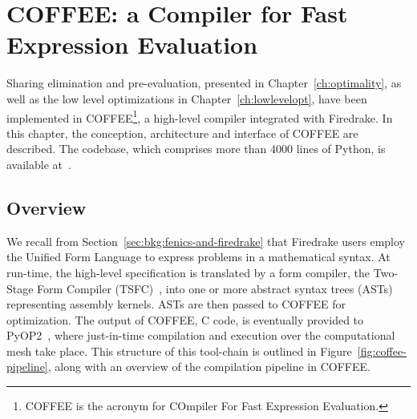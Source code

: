\chapter{COFFEE: a Compiler for Fast Expression Evaluation}
\label{ch:coffee}

Sharing elimination and pre-evaluation, presented in Chapter~\ref{ch:optimality}, as well as the low level optimizations in Chapter~\ref{ch:lowlevelopt}, have been implemented in COFFEE\footnote{COFFEE is the acronym for COmpiler For Fast Expression Evaluation.}, a high-level compiler integrated with Firedrake. In this chapter, the conception, architecture and interface of COFFEE are described. The codebase, which comprises more than 4000 lines of Python, is available at~\citep{coffee-code}.


\section{Overview}

We recall from Section~\ref{sec:bkg:fenics-and-firedrake} that Firedrake users employ the Unified Form Language to express problems in a mathematical syntax. At run-time, the high-level specification is translated by a form compiler, the Two-Stage Form Compiler (TSFC)~\citep{TSFC}, into one or more abstract syntax trees (ASTs) representing assembly kernels. ASTs are then passed to COFFEE for optimization. The output of COFFEE, C code, is eventually provided to PyOP2~\citep{pyop2isc}, where just-in-time compilation and execution over the computational mesh take place. This structure of this tool-chain is outlined in Figure~\ref{fig:coffee-pipeline}, along with an overview of the compilation pipeline in COFFEE. 

